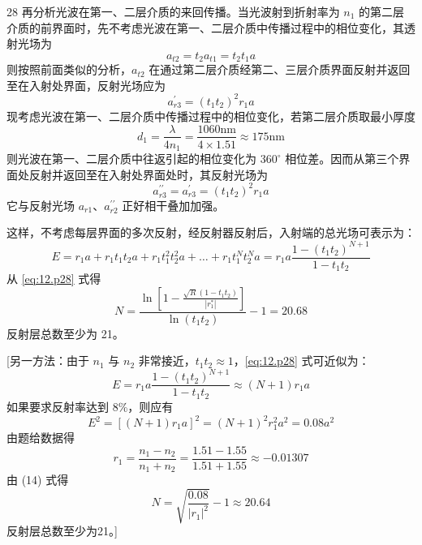 \begin{solution}{28}
  再分析光波在第一、二层介质的来回传播。当光波射到折射率为 $n_1$ 的第二层介质的前界面时，先不考虑光波在第一、二层介质中传播过程中的相位变化，其透射光场为
  \begin{equation}
    a_{t 2} = t_{2} a_{t 1} = t_{2} t_{1} a
    \label{eq:8.p28}
  \end{equation}
  则按照前面类似的分析，$a_{t2}$ 在通过第二层介质经第二、三层介质界面反射并返回至在入射处界面，反射光场应为
  \begin{equation}
    a_{r 3}^{\prime} = (t_{1} t_{2})^{2} r_{1} a
    \label{eq:9.p28}
  \end{equation}
  现考虑光波在第一、二层介质中传播过程中的相位变化，若第二层介质取最小厚度
  \begin{equation}
    d_{1} = \frac{\lambda}{4 n_{1}} = \frac{1060 \mathrm{nm}}{4 \times 1.51} \approx 175 \mathrm{nm}
    \label{eq:10.p28}
  \end{equation}
  则光波在第一、二层介质中往返引起的相位变化为 $360^{\circ}$ 相位差。因而从第三个界面处反射并返回至在入射处界面处时，其反射光场为
  \begin{equation}
    a_{r 3}^{\prime \prime} = a_{r 3}^{\prime} = (t_{1} t_{2})^{2} r_{1} a
    \label{eq:11.p28}
  \end{equation}
  它与反射光场 $a_{r1}$、$a_{r2}^{\prime \prime}$ 正好相干叠加加强。

  这样，不考虑每层界面的多次反射，经反射器反射后，入射端的总光场可表示为：
  \begin{equation}
    E = r_{1} a + r_{1} t_{1} t_{2} a + r_{1} t_{1}^{2} t_{2}^{2} a + \dots + r_{1} t_{1}^{N} t_{2}^{N} a = r_{1} a \frac{1 - (t_{1} t_{2})^{N + 1}}{1 - t_{1} t_{2}}
    \label{eq:12.p28}
  \end{equation}
  从 \eqref{eq:12.p28} 式得
  \begin{equation}
    N = \frac{\ln \left[ 1 - \frac{\sqrt{R} (1 - t_{1} t_{2})}{|r_{1}^{*}|} \right]}{\ln (t_{1} t_{2})} - 1 = 20.68
    \label{eq:13.p28}
  \end{equation}
  反射层总数至少为 21。

  [另一方法：由于 $n_1$ 与 $n_2$ 非常接近，$t_1t_2 \approx 1$，\eqref{eq:12.p28} 式可近似为：
  \begin{equation}
    E = r_{1} a \frac{1 - (t_{1} t_{2})^{N + 1}}{1 - t_{1} t_{2}} \approx (N + 1) r_{1} a
  \end{equation}
  如果要求反射率达到 8\%，则应有
  \begin{equation}
    E^{2} = \left[ (N + 1) r_{1} a \right]^{2} = (N + 1)^{2} r_{1}^{2} a^{2} = 0.08 a^{2}
  \end{equation}
  由题给数据得
  \begin{equation}
    r_{1} = \frac{n_{1} - n_{2}}{n_{1} + n_{2}} = \frac{1.51 - 1.55}{1.51 + 1.55} \approx -0.01307
  \end{equation}
  由 (14) 式得
  \begin{equation}
    N = \sqrt{\frac{0.08}{|r_{1}|^{2}}} - 1 \approx 20.64
    \label{eq:14.p28}
  \end{equation}
  反射层总数至少为21。]
\end{solution}